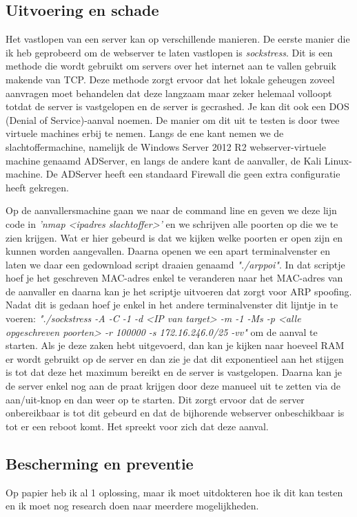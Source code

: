 \documentclass[pdftex,a4paper,12pt]{report}
\begin{document}
\subsection{Uitvoering en schade}
Het vastlopen van een server kan op verschillende manieren. De eerste manier die ik heb geprobeerd om de webserver te laten vastlopen is \textit{sockstress}. Dit is een methode die wordt gebruikt om servers over het internet aan te vallen gebruik makende van TCP. Deze methode zorgt ervoor dat het lokale geheugen zoveel aanvragen moet behandelen dat deze langzaam maar zeker helemaal volloopt totdat de server is vastgelopen en de server is gecrashed. Je kan dit ook een DOS (Denial of Service)-aanval noemen. De manier om dit uit te testen is door twee virtuele machines erbij te nemen. Langs de ene kant nemen we de slachtoffermachine, namelijk de Windows Server 2012 R2 webserver-virtuele machine genaamd ADServer, en langs de andere kant de aanvaller, de Kali Linux-machine. De ADServer heeft een standaard Firewall die geen extra configuratie heeft gekregen. \newline \newline 

Op de aanvallersmachine gaan we naar de command line en geven we deze lijn code in \textit{'nmap <ipadres slachtoffer>'} en we schrijven alle poorten op die we te zien krijgen. Wat er hier gebeurd is dat we kijken welke poorten er open zijn en kunnen worden aangevallen. Daarna openen we een apart terminalvenster en laten we daar een gedownload script draaien genaamd \textit{"./arppoi"}. In dat scriptje hoef je het geschreven MAC-adres enkel te veranderen naar het MAC-adres van de aanvaller en daarna kan je het scriptje uitvoeren dat zorgt voor ARP spoofing. Nadat dit is gedaan hoef je enkel in het andere terminalvenster dit lijntje in te voeren: \textit{"./sockstress -A -C -1 -d <IP van target> -m -1 -Ms -p <alle opgeschreven poorten> -r 100000 -s 172.16.246.0/25 -vv"} om de aanval te starten. Als je deze zaken hebt uitgevoerd, dan kan je kijken naar hoeveel RAM er wordt gebruikt op de server en dan zie je dat dit exponentieel aan het stijgen is tot dat deze het maximum bereikt en de server is vastgelopen. Daarna kan je de server enkel nog aan de praat krijgen door deze manueel uit te zetten via de aan/uit-knop en dan weer op te starten. Dit zorgt ervoor dat de server onbereikbaar is tot dit gebeurd en dat de bijhorende webserver onbeschikbaar is tot er een reboot komt. Het spreekt voor zich dat deze aanval.

\subsection{Bescherming en preventie}
Op papier heb ik al 1 oplossing, maar ik moet uitdokteren hoe ik dit kan testen en ik moet nog research doen naar meerdere mogelijkheden.
\end{document}
